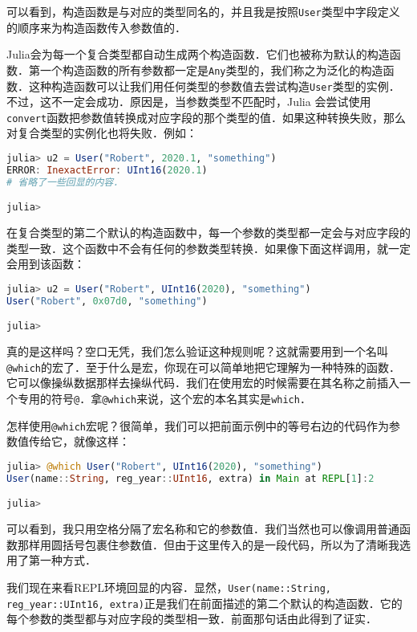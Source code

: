 可以看到，构造函数是与对应的类型同名的，并且我是按照\verb|User|类型中字段定义的顺序来为构造函数传入参数值的．

Julia会为每一个复合类型都自动生成两个构造函数．它们也被称为默认的构造函数．第一个构造函数的所有参数都一定是\verb|Any|类型的，我们称之为泛化的构造函数．这种构造函数可以让我们用任何类型的参数值去尝试构造\verb|User|类型的实例．不过，这不一定会成功．原因是，当参数类型不匹配时，Julia 会尝试使用\verb|convert|函数把参数值转换成对应字段的那个类型的值．如果这种转换失败，那么对复合类型的实例化也将失败．例如：

\begin{lstlisting}[language=julia]
julia> u2 = User("Robert", 2020.1, "something")
ERROR: InexactError: UInt16(2020.1)
# 省略了一些回显的内容．

julia> 
\end{lstlisting}

在复合类型的第二个默认的构造函数中，每一个参数的类型都一定会与对应字段的类型一致．这个函数中不会有任何的参数类型转换．如果像下面这样调用，就一定会用到该函数：

\begin{lstlisting}[language=julia]
julia> u2 = User("Robert", UInt16(2020), "something")
User("Robert", 0x07d0, "something")

julia> 
\end{lstlisting}

真的是这样吗？空口无凭，我们怎么验证这种规则呢？这就需要用到一个名叫\verb|@which|的宏了．至于什么是宏，你现在可以简单地把它理解为一种特殊的函数．它可以像操纵数据那样去操纵代码．我们在使用宏的时候需要在其名称之前插入一个专用的符号\verb|@|．拿\verb|@which|来说，这个宏的本名其实是\verb|which|．

怎样使用\verb|@which|宏呢？很简单，我们可以把前面示例中的等号右边的代码作为参数值传给它，就像这样：

\begin{lstlisting}[language=julia]
julia> @which User("Robert", UInt16(2020), "something")
User(name::String, reg_year::UInt16, extra) in Main at REPL[1]:2

julia> 
\end{lstlisting}

可以看到，我只用空格分隔了宏名称和它的参数值．我们当然也可以像调用普通函数那样用圆括号包裹住参数值．但由于这里传入的是一段代码，所以为了清晰我选用了第一种方式．

我们现在来看REPL环境回显的内容．显然，\verb|User(name::String, reg_year::UInt16, extra)|正是我们在前面描述的第二个默认的构造函数．它的每个参数的类型都与对应字段的类型相一致．前面那句话由此得到了证实．


